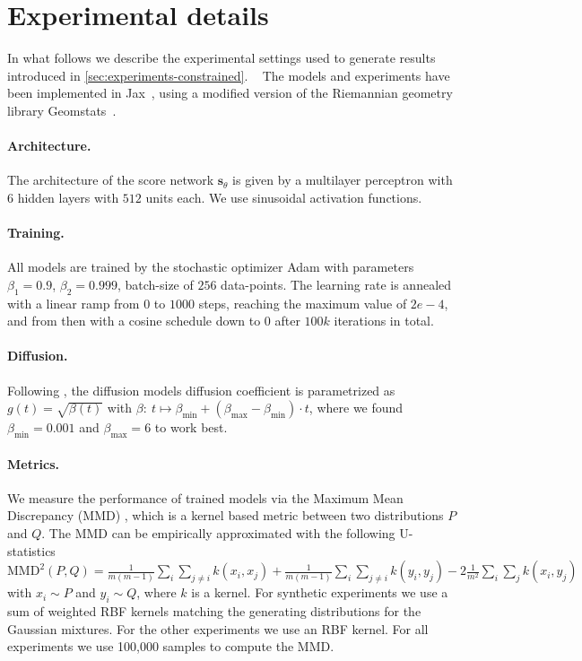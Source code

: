 \section{Experimental details}
\label{sec:exp_details}

In what follows we describe the experimental settings used to generate results introduced in \cref{sec:experiments-constrained}.
~
The models and experiments have been implemented in Jax~\parencite{jax2018github}, using a modified version of the Riemannian geometry library Geomstats~\parencite{geomstats2020}.

\paragraph{Architecture.}
The architecture of the score network \(\bm{s}_\theta\) is given by a multilayer perceptron with \(6\) hidden layers with \(512\) units each.
We use sinusoidal activation functions.

\paragraph{Training.}
All models are trained by the stochastic optimizer Adam \parencite{kingma2014adam} with parameters \(\beta_1=0.9\), \(\beta_2=0.999\), batch-size of \(256\) data-points.
The learning rate is annealed with a linear ramp from \(0\) to \(1000\) steps, reaching the maximum value of \(2e-4\), and from then with a cosine schedule down to \(0\) after \(100k\) iterations in total.

\paragraph{Diffusion.}
Following \textcite{song2020score}, the diffusion models diffusion coefficient is parametrized as \(g(t) = \sqrt{\beta(t)}\) with \(\beta: \ t \mapsto \beta_{\min} + (\beta_{\max} - \beta_{\min}) \cdot t\), where we found \(\beta_{\min}=0.001\) and \(\beta_{\max}=6\) to work best.

\paragraph{Metrics.}
We measure the performance of trained models via the Maximum Mean Discrepancy (MMD) \parencite{gretton2012kernel}, which is a kernel based metric between two distributions \(P\) and \(Q\).
The MMD can be empirically approximated with the following U-statistics \(\mathrm{MMD}^2(P, Q) = \tfrac{1}{m(m-1)} \sum_i \sum_{j \neq i} k(x_i, x_j) + \tfrac{1}{m(m-1)} \sum_i \sum_{j \neq i} k(y_i, y_j) - 2 \tfrac{1}{m^2} \sum_i \sum_{j} k(x_i, y_j)\) with \(x_i \sim P\) and \(y_i \sim Q\), where \(k\) is a kernel.
For synthetic experiments we use a sum of weighted RBF kernels matching the generating distributions for the Gaussian mixtures.
For the other experiments we use an RBF kernel.
For all experiments we use 100,000 samples to compute the MMD.

